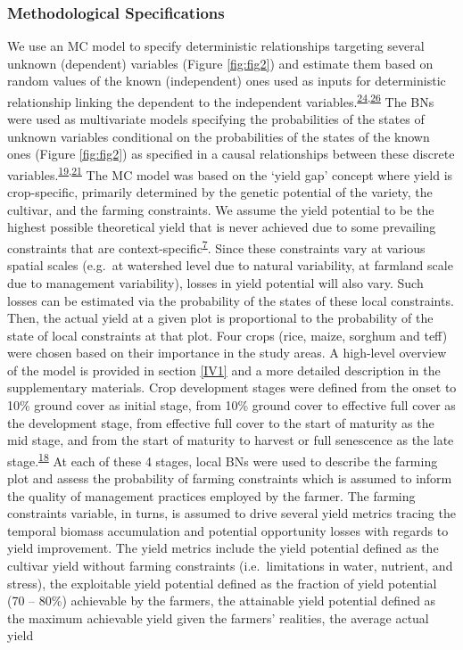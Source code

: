 \documentclass[12pt,oneside]{article}
\begin{document}
\hypertarget{III12}{%
\subsubsection{Methodological Specifications}\label{III12}}

We use an MC model to specify deterministic relationships targeting several unknown (dependent) variables (Figure \ref{fig:fig2}) and estimate them based on random values of the known (independent) ones used as inputs for deterministic relationship linking the dependent to the independent variables.\textsuperscript{\protect\hyperlink{ref-Rosenstock_et_al_2014}{24},\protect\hyperlink{ref-Luedeling_et_al_2015}{26}} The BNs were used as multivariate models specifying the probabilities of the states of unknown variables conditional on the probabilities of the states of the known ones (Figure \ref{fig:fig2}) as specified in a causal relationships between these discrete variables.\textsuperscript{\protect\hyperlink{ref-Pearl_1988}{19},\protect\hyperlink{ref-Jensen_1996}{21}} The MC model was based on the `yield gap' concept where yield is crop-specific, primarily determined by the genetic potential of the variety, the cultivar, and the farming constraints. We assume the yield potential to be the highest possible theoretical yield that is never achieved due to some prevailing constraints that are context-specific\textsuperscript{\protect\hyperlink{ref-VanIttersum_et_al_2013}{7}}. Since these constraints vary at various spatial scales (e.g.~at watershed level due to natural variability, at farmland scale due to management variability), losses in yield potential will also vary. Such losses can be estimated via the probability of the states of these local constraints. Then, the actual yield at a given plot is proportional to the probability of the state of local constraints at that plot. Four crops (rice, maize, sorghum and teff) were chosen based on their importance in the study areas. A high-level overview of the model is provided in section \ref{IV1} and a more detailed description in the supplementary materials. Crop development stages were defined from the onset to 10\% ground cover as initial stage, from 10\% ground cover to effective full cover as the development stage, from effective full cover to the start of maturity as the mid stage, and from the start of maturity to harvest or full senescence as the late stage.\textsuperscript{\protect\hyperlink{ref-Allen_et_al_1998}{18}} At each of these 4 stages, local BNs were used to describe the farming plot and assess the probability of farming constraints which is assumed to inform the quality of management practices employed by the farmer. The farming constraints variable, in turns, is assumed to drive several yield metrics tracing the temporal biomass accumulation and potential opportunity losses with regards to yield improvement. The yield metrics include the yield potential defined as the cultivar yield without farming constraints (i.e.~limitations in water, nutrient, and stress), the exploitable yield potential defined as the fraction of yield potential (70 -- 80\%) achievable by the farmers, the attainable yield potential defined as the maximum achievable yield given the farmers' realities, the average actual yield 
\end{document}
